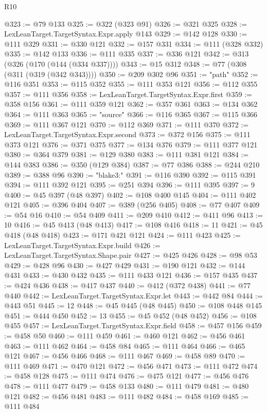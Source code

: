\begin{lexlean}{R10}
\begin{coremodule}
{{{{{{{{{{{{{{{{{{{{{{{{{{{{{{{{{{{{{{{{{{{{{{{{{{{{{{{{{{{{{{{{{{{{{{{{{{{{{{{{{{{{{{{{{{{{{{{{{{{{{{{{{{{{@323 := @79 @133
@325 := @322 (@323 @91)
@326 := @321 @325
@328 := LexLeanTarget.TargetSyntax.Expr.apply @143
@329 := @142 @128
@330 := @111 @329
@331 := @330 @121
@332 := @157 @331
@334 := @111 (@328 @332)
@335 := @142 @133
@336 := @111 @335
@337 := @336 @121
@342 := @313 (@326 (@170 (@144 (@334 @337))))
@343 := @15 @312
@348 := @77 (@308 (@311 (@319 (@342 @343))))
@350 := @209 @302 @96
@351 := "path"
@352 := @116 @351
@353 := @115 @352
@355 := @111 @353 @121
@356 := @112 @355
@357 := @111 @356
@358 := LexLeanTarget.TargetSyntax.Expr.first
@359 := @358 @156
@361 := @111 @359 @121
@362 := @357 @361
@363 := @134 @362
@364 := @111 @363
@365 := "source"
@366 := @116 @365
@367 := @115 @366
@369 := @111 @367 @121
@370 := @112 @369
@371 := @111 @370
@372 := LexLeanTarget.TargetSyntax.Expr.second
@373 := @372 @156
@375 := @111 @373 @121
@376 := @371 @375
@377 := @134 @376
@379 := @111 @377 @121
@380 := @364 @379
@381 := @129 @380
@383 := @111 @381 @121
@384 := @144 @383
@386 := @350 (@129 @384)
@387 := @77 @386
@388 := @244 @210
@389 := @388 @96
@390 := "blake3:"
@391 := @116 @390
@392 := @115 @391
@394 := @111 @392 @121
@395 := @251 @394
@396 := @111 @395
@397 := 9
@400 := @45 @397 (@48 @397)
@402 := @108 @400 @145
@404 := @111 @402 @121
@405 := @396 @404
@407 := @389 (@256 @405)
@408 := @77 @407
@409 := @54 @16
@410 := @54 @409
@411 := @209 @410
@412 := @411 @96
@413 := 10
@416 := @45 @413 (@48 @413)
@417 := @108 @416
@418 := 11
@421 := @45 @418 (@48 @418)
@423 := @171 @421 @121
@424 := @111 @423
@425 := LexLeanTarget.TargetSyntax.Expr.build
@426 := LexLeanTarget.TargetSyntax.Shape.pair
@427 := @425 @426
@428 := @98 @53
@429 := @428 @96
@430 := @427 @429
@431 := @190 @121
@432 := @144 @431
@433 := @430 @432
@435 := @111 @433 @121
@436 := @157 @435
@437 := @424 @436
@438 := @417 @437
@440 := @412 (@372 @438)
@441 := @77 @440
@442 := LexLeanTarget.TargetSyntax.Expr.let
@443 := @442 @84
@444 := @443 @51
@445 := 12
@448 := @45 @445 (@48 @445)
@450 := @108 @448 @145
@451 := @444 @450
@452 := 13
@455 := @45 @452 (@48 @452)
@456 := @108 @455
@457 := LexLeanTarget.TargetSyntax.Expr.field
@458 := @457 @156
@459 := @458 @50
@460 := @111 @459
@461 := @460 @121
@462 := @456 @461
@463 := @111 @462
@464 := @458 @84
@465 := @111 @464
@466 := @465 @121
@467 := @456 @466
@468 := @111 @467
@469 := @458 @89
@470 := @111 @469
@471 := @470 @121
@472 := @456 @471
@473 := @111 @472
@474 := @458 @128
@475 := @111 @474
@476 := @475 @121
@477 := @456 @476
@478 := @111 @477
@479 := @458 @133
@480 := @111 @479
@481 := @480 @121
@482 := @456 @481
@483 := @111 @482
@484 := @458 @169
@485 := @111 @484
}}}}}}}}}}}}}}}}}}}}}}}}}}}}}}}}}}}}}}}}}}}}}}}}}}}}}}}}}}}}}}}}}}}}}}}}}}}}}}}}}}}}}}}}}}}}}}}}}}}}}}}}}}}}
\end{coremodule}
\end{lexlean}
